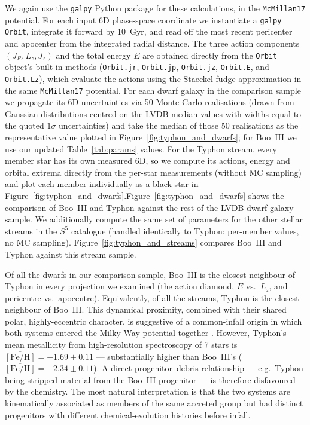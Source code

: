 \documentclass[twocolumn]{aastex631}
\newcommand{\SSSSS}{${S}^5$\xspace}
\begin{document}
We again use the \texttt{galpy} Python package for these calculations, in the \texttt{McMillan17} potential. For each input 6D phase-space coordinate we instantiate a \texttt{galpy} \texttt{Orbit}, integrate it forward by 10~Gyr, and read off the most recent pericenter and apocenter from the integrated radial distance. The three action components $(J_R, L_z, J_z)$ and the total energy $E$ are obtained directly from the \texttt{Orbit} object's built-in methods (\texttt{Orbit.jr}, \texttt{Orbit.jp}, \texttt{Orbit.jz}, \texttt{Orbit.E}, and \texttt{Orbit.Lz}), which evaluate the actions using the Staeckel-fudge approximation \citep{Binney2012Staeckel} in the same \texttt{McMillan17} potential. For each dwarf galaxy in the comparison sample we propagate its 6D uncertainties via 50 Monte-Carlo realisations (drawn from Gaussian distributions centred on the LVDB median values with widths equal to the quoted $1\sigma$ uncertainties) and take the median of those 50 realisations as the representative value plotted in Figure~\ref{fig:typhon_and_dwarfs}; for Boo~III we use our updated Table~\ref{tab:params} values. For the Typhon stream, every member star has its own measured 6D, so we compute its actions, energy and orbital extrema directly from the per-star measurements (without MC sampling) and plot each member individually as a black star in Figure~\ref{fig:typhon_and_dwarfs}.Figure~\ref{fig:typhon_and_dwarfs} shows the comparison of Boo~III and Typhon against the rest of the LVDB dwarf-galaxy sample. We additionally compute the same set of parameters for the other stellar streams in the \SSSSS catalogue (handled identically to Typhon: per-member values, no MC sampling). Figure~\ref{fig:typhon_and_streams} compares Boo~III and Typhon against this stream sample.

Of all the dwarfs in our comparison sample, Boo~III is the closest neighbour of Typhon in every projection we examined (the action diamond, $E$ vs.~$L_z$, and pericentre vs.~apocentre). Equivalently, of all the streams, Typhon is the closest neighbour of Boo~III. This dynamical proximity, combined with their shared polar, highly-eccentric character, is suggestive of a common-infall origin in which both systems entered the Milky Way potential together \citep[similar in spirit to other proposed accreted groups, e.g.][]{Ji2023Typhon}. However, Typhon's mean metallicity from high-resolution spectroscopy of 7 stars is $\overline{[\mathrm{Fe/H}]} = -1.69 \pm 0.11$ \citep{Ji2023Typhon} --- substantially higher than Boo~III's ($\overline{[\mathrm{Fe/H}]} = -2.34 \pm 0.11$). A direct progenitor--debris relationship --- e.g.\ Typhon being stripped material from the Boo~III progenitor --- is therefore disfavoured by the chemistry. The most natural interpretation is that the two systems are kinematically associated as members of the same accreted group but had distinct progenitors with different chemical-evolution histories before infall.
\end{document}

